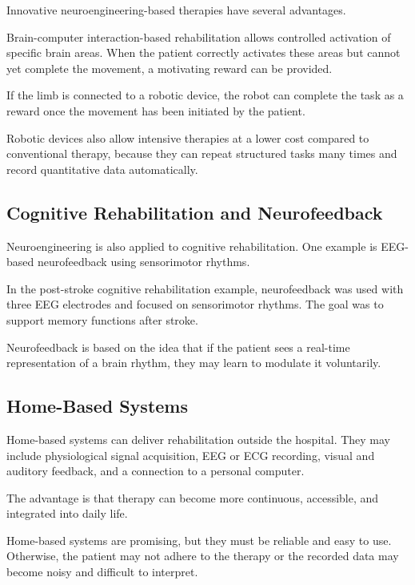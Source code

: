 Innovative neuroengineering-based therapies have several advantages.

Brain-computer interaction-based rehabilitation allows controlled activation of specific brain areas. When the patient correctly activates these areas but cannot yet complete the movement, a motivating reward can be provided.

If the limb is connected to a robotic device, the robot can complete the task as a reward once the movement has been initiated by the patient.

Robotic devices also allow intensive therapies at a lower cost compared to conventional therapy, because they can repeat structured tasks many times and record quantitative data automatically.

\subsection{Cognitive Rehabilitation and Neurofeedback}

Neuroengineering is also applied to cognitive rehabilitation. One example is EEG-based neurofeedback using sensorimotor rhythms.

In the post-stroke cognitive rehabilitation example, neurofeedback was used with three EEG electrodes and focused on sensorimotor rhythms. The goal was to support memory functions after stroke.

\begin{authornote}
Neurofeedback is based on the idea that if the patient sees a real-time representation of a brain rhythm, they may learn to modulate it voluntarily.
\end{authornote}

\subsection{Home-Based Systems}

Home-based systems can deliver rehabilitation outside the hospital. They may include physiological signal acquisition, EEG or ECG recording, visual and auditory feedback, and a connection to a personal computer.

The advantage is that therapy can become more continuous, accessible, and integrated into daily life.

\begin{authornote}
Home-based systems are promising, but they must be reliable and easy to use. Otherwise, the patient may not adhere to the therapy or the recorded data may become noisy and difficult to interpret.
\end{authornote}

